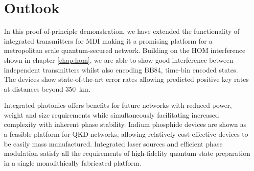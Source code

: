 %
%

%


\section{Outlook}

In this proof-of-principle demonstration, we have extended the functionality of integrated transmitters for \acl{MDI} making it a promising platform for a metropolitan scale quantum-secured network. Building on the \acl{HOM} interference shown in chapter \ref{chap:hom}, we are able to show good interference between independent transmitters whilst also encoding BB84, time-bin encoded states. The devices show state-of-the-art error rates allowing predicted positive key rates at distances beyond \SI{350}{\km}.

Integrated photonics offers benefits for future networks with reduced power, weight and size requirements while simultaneously facilitating increased complexity with inherent phase stability. Indium phosphide devices are shown as a feasible platform for \ac{QKD} networks, allowing relatively cost-effective devices to be easily mass manufactured. Integrated laser sources and efficient phase modulation satisfy all the requirements of high-fidelity quantum state preparation in a single monolithically fabricated platform. 

